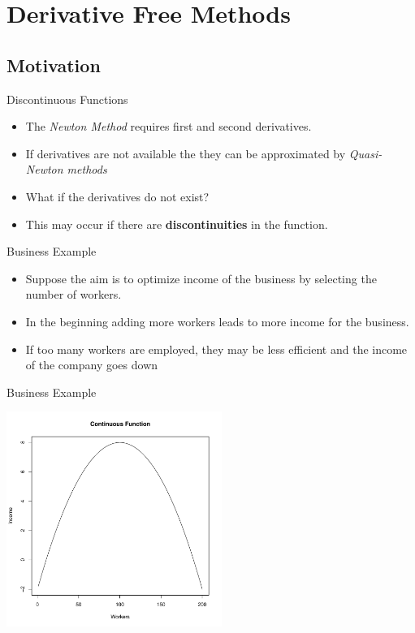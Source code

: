 \documentclass[10pt]{beamer}
\begin{document}
\section{Derivative Free Methods}
\subsection{Motivation}
\begin{frame}{Discontinuous Functions}
  \begin{itemize}
  \item The {\em Newton Method} requires first and second derivatives.

  \item If derivatives are not available the they can be approximated by {\em Quasi-Newton methods}

  \item What if the derivatives do not exist?

  \item This may occur if there are {\bf discontinuities} in the function.
  \end{itemize}
\end{frame}
\begin{frame}{Business Example}
  \begin{itemize}
  \item Suppose the aim is to optimize income of the business by selecting the number of workers.

  \item In the beginning adding more workers leads to more income for the business.

  \item If too many workers are employed, they may be less efficient and the income of the company goes down
  \end{itemize}
\end{frame}
\begin{frame}{Business Example}
  \begin{center}
    \includegraphics[height=7cm]{RCode/contfunc.pdf}
  \end{center}
\end{frame}
\end{document}
